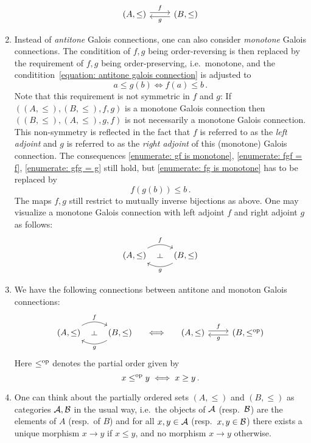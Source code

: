 \begin{remark}
\begin{enumerate}
      \[
        \begin{tikzcd}
            (A,\leq)
            \arrow[shift left]{r}[above]{f}
          & (B,\leq)
            \arrow[shift left]{l}[below]{g}
        \end{tikzcd}
      \]
    \item
      Instead of \emph{antitone} Galois connections, one can also consider \emph{monotone} Galois connections.
      The conditition of $f, g$ being order-reversing is then replaced by the requirement of $f, g$ being order-preserving, i.e.\ monotone, and the conditition~\eqref{equation: antitone galois connection} is adjusted to
      \[
              a \leq g(b)
        \iff  f(a) \leq b \,.
      \]
      Note that this requirement is not symmetric in $f$ and $g$:
      If $((A, \leq), (B, \leq), f, g)$ is a monotone Galois connection then $((B, \leq), (A, \leq), g, f)$ is not necessarily a monotone Galois connection.
      This non-symmetry is reflected in the fact that $f$ is referred to as the \emph{left adjoint} and $g$ is referred to as the \emph{right adjoint} of this (monotone) Galois connection.
      The consequences \ref*{enumerate: gf is monotone}, \ref*{enumerate: fgf = f}, \ref*{enumerate: gfg = g} still hold, but \ref*{enumerate: fg is monotone} has to be replaced by
      \[
        f(g(b)) \leq b \,.
      \]
      The maps $f, g$ still restrict to mutually inverse bijections as above.
      One may visualize a monotone Galois connection with left adjoint $f$ and right adjoint $g$ as follows:
      \[
        \begin{tikzcd}
            (A,\leq)
            \arrow[bend left]{r}[above]{f}
            \arrow[phantom]{r}[rotate=90]{\vdash}
          & (B,\leq)
            \arrow[bend left]{l}[below]{g}
        \end{tikzcd}
      \]
    \item
      We have the following connections between antitone and monoton Galois connections:
      \[
          \begin{tikzcd}
              (A,\leq)
              \arrow[bend left]{r}[above]{f}
              \arrow[phantom]{r}[rotate=90]{\vdash}
            & (B,\leq)
              \arrow[bend left]{l}[below]{g}
          \end{tikzcd}
          \quad\iff\quad
          \begin{tikzcd}
              (A,\leq)
              \arrow[shift left]{r}[above]{f}
            & (B,\leq^{\op})
              \arrow[shift left]{l}[below]{g}
          \end{tikzcd}
      \]
      Here $\leq^{\mathrm{op}}$ denotes the partial order given by
      \[
              x \leq^{\mathrm{op}} y
        \iff  x \geq y \,.
      \]
    \item
      One can think about the partially ordered sets $(A, \leq)$ and $(B, \leq)$ as categories $\mathcal{A}, \mathcal{B}$ in the usual way, i.e.\ the objects of $\mathcal{A}$ (resp.\ $\mathcal{B}$) are the elements of $A$ (resp.\ of $B$) and for all $x, y \in \mathcal{A}$ (resp.\ $x, y \in \mathcal{B}$) there exists a unique morphism $x \to y$ if $x \leq y$, and no morphism $x \to y$ otherwise.
      

\end{enumerate}
\end{remark}
